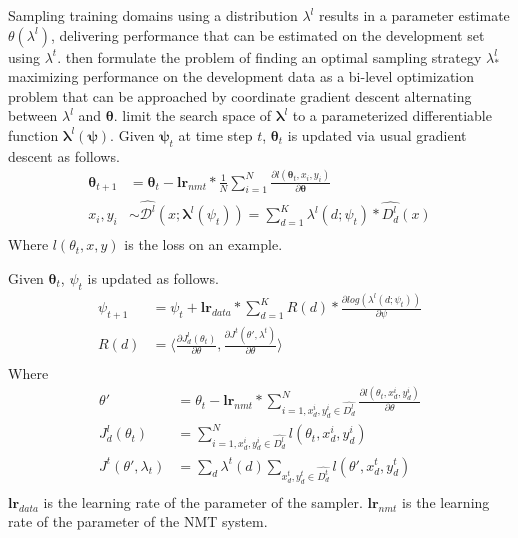 \documentclass[11pt,a4paper]{article}
\newcommand{\fyTodo}[1]{\Todo[FY:]{\textcolor{orange}{#1}}}
\newcommand{\system}[1]{\texttt{{#1}}}
\newcommand{\vlambda}{\ensuremath{\boldsymbol\lambda}\xspace} %
\newcommand{\vtheta}{\ensuremath{\boldsymbol\theta}\xspace} %
\newcommand{\vpsi}{\ensuremath{\boldsymbol\psi}\xspace} %
\begin{document}
Sampling training domains using a distribution $\lambda^{l}$ results in a parameter estimate $\theta(\lambda^{l})$, delivering performance that can be estimated on the development set using $\lambda^{t}$. \citet{Wang20optimizing,Wang20balancing} then formulate the problem of finding an optimal sampling strategy $\lambda^{l}_{*}$ maximizing performance on the development data as a bi-level optimization problem that can be approached by coordinate gradient descent alternating between $\lambda^{l}$ and $\vtheta$. \citet{Wang20balancing} limit the search space of $\vlambda^{l}$ to a parameterized differentiable function $\vlambda^{l}(\vpsi)$. Given $\vpsi_t$ at time step $t$, $\vtheta_t$ is updated via usual gradient descent as follows.
\begin{align*}
\vtheta_{t+1} &= \vtheta_t - \mathbf{lr}_{nmt} * \frac{1}{N} \displaystyle{\mathop{\sum}_{i=1}^N} \frac{\partial l(\vtheta_t, x_i,y_i)}{\partial \vtheta} \\
x_i,y_i &\sim \widehat{\mathcal{D}^l}(x;\vlambda^l(\psi_t)) = \displaystyle{\mathop{\sum}_{d=1}^K} \lambda^l(d;\psi_t) * \widehat{D^l_d}(x) \\
\end{align*}
Where $l(\theta_t,x,y)$ is the loss on an example.

Given $\vtheta_t$, $\psi_t$ is updated as follows.
\begin{align*}
\psi_{t+1} &= \psi_t + \mathbf{lr}_{data} * \displaystyle{\mathop{\sum}_{d=1}^K} R(d) * \frac{\partial log(\lambda^l(d;\psi_t))}{\partial \psi} \\
  R(d) &= \langle \frac{\partial J^l_d(\theta_t)}{\partial \theta}, \frac{\partial J^t(\theta', \lambda^t)}{\partial \theta} \rangle \\
\end{align*}
Where
\begingroup
\allowdisplaybreaks
\begin{align*}
\theta' &= \theta_t - \mathbf{lr}_{nmt} * \displaystyle{\mathop{\sum}_{i=1,x^i_d,y^i_d \in \widehat{D^l_d}}^N} \frac{\partial l(\theta_t,x^i_d,y^i_d)}{\partial \theta} \\
  J^l_d(\theta_t) &= \displaystyle{\mathop{\sum}_{i=1,x^i_d,y^i_d \in \widehat{D^l_d}}^N} l(\theta_t,x^i_d,y^i_d) \\
  J^t(\theta',\lambda_t) &= \displaystyle{\mathop{\sum}_{d}}\lambda^t(d)\displaystyle{\mathop{\sum}_{x^t_d,y^t_d \in \widehat{D^t_d}}} l(\theta',x^t_d,y^t_d)\\
\end{align*}
\endgroup
$\mathbf{lr}_{data}$ is the learning rate of the parameter of the sampler. $\mathbf{lr}_{nmt}$ is the learning rate of the parameter of the NMT system. \fyTodo{Explain lr, may be more}\fyTodo{More refs to the algorithm }
\end{document}
